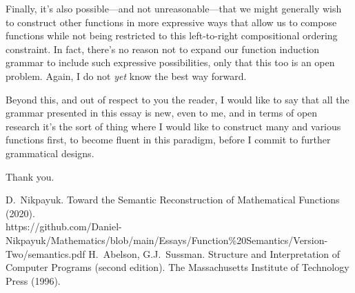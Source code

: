 \documentclass[twoside]{article}
\begin{document}
Finally, it's also possible---and not unreasonable---that we might generally wish to construct other functions in more
expressive ways that allow us to compose functions while not being restricted to this left-to-right compositional
ordering constraint. In fact, there's no reason not to expand our function induction grammar to include such expressive
possibilities, only that this too is an open problem. Again, I do not \emph{yet} know the best way forward.

Beyond this, and out of respect to you the reader, I would like to say that all the grammar presented in this essay
is new, even to me, and in terms of open research it's the sort of thing where I would like to construct many
and various functions first, to become fluent in this paradigm, before I commit to further grammatical designs.

Thank you.

\vspace{\fill}

\begin{thebibliography}{99}
 D.~Nikpayuk. Toward the Semantic Reconstruction of Mathematical Functions (2020).\\
    https://github.com/Daniel-Nikpayuk/Mathematics/blob/main/Essays/Function\%20Semantics/Version-Two/semantics.pdf
 H.~Abelson, G.J.~Sussman. Structure and Interpretation of Computer Programs (second edition).
               The Massachusetts Institute of Technology Press (1996).
\end{thebibliography}
\end{document}
